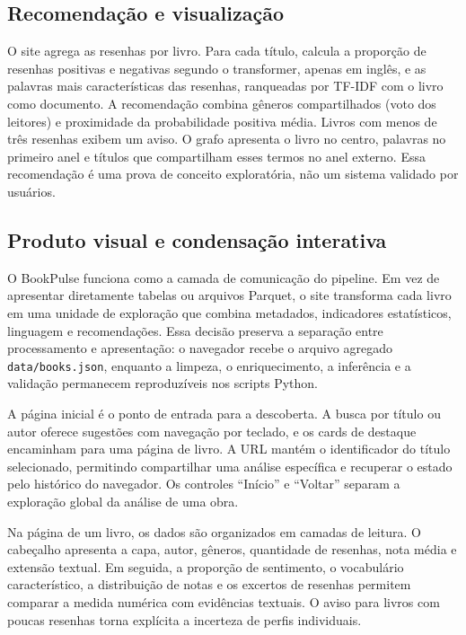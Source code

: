 \documentclass[conference]{IEEEtran}
\begin{document}
\subsection{Recomendação e visualização}

O site agrega as resenhas por livro. Para cada título, calcula a proporção de
resenhas positivas e negativas segundo o transformer, apenas em inglês, e as
palavras mais características das resenhas, ranqueadas por TF-IDF com o livro
como documento. A recomendação combina gêneros compartilhados (voto dos
leitores) e proximidade da probabilidade positiva média. Livros com menos de
três resenhas exibem um aviso. O grafo apresenta o livro no centro, palavras no
primeiro anel e títulos que compartilham esses termos no anel externo. Essa
recomendação é uma prova de conceito exploratória, não um sistema validado por
usuários.

\subsection{Produto visual e condensação interativa}

O BookPulse funciona como a camada de comunicação do pipeline. Em vez de
apresentar diretamente tabelas ou arquivos Parquet, o site transforma cada
livro em uma unidade de exploração que combina metadados, indicadores
estatísticos, linguagem e recomendações. Essa decisão preserva a separação
entre processamento e apresentação: o navegador recebe o arquivo agregado
\texttt{data/books.json}, enquanto a limpeza, o enriquecimento, a inferência e
a validação permanecem reproduzíveis nos scripts Python.

A página inicial é o ponto de entrada para a descoberta. A busca por título ou
autor oferece sugestões com navegação por teclado, e os cards de destaque
encaminham para uma página de livro. A URL mantém o identificador do título
selecionado, permitindo compartilhar uma análise específica e recuperar o
estado pelo histórico do navegador. Os controles ``Início'' e ``Voltar''
separam a exploração global da análise de uma obra.

Na página de um livro, os dados são organizados em camadas de leitura. O
cabeçalho apresenta a capa, autor, gêneros, quantidade de resenhas, nota média
e extensão textual. Em seguida, a proporção de sentimento, o vocabulário
característico, a distribuição de notas e os excertos de resenhas permitem
comparar a medida numérica com evidências textuais. O aviso para livros com
poucas resenhas torna explícita a incerteza de perfis individuais.
\end{document}

